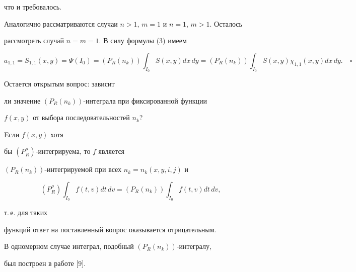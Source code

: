 что и требовалось.





Аналогично рассматриваются случаи $n>1$, $m=1$ и $n=1$, $m>1$. Осталось 


рассмотреть случай $n=m=1$. В силу формулы (3) имеем 


$$


a_{1,1}=S_{1,1}(x,y)=\Psi (I_{0})=


(P_{R}(n_k))\int_{I_0}S(x,y)dx\,dy=


(P_{R}(n_k))\int_{I_0}S(x,y)\chi _{1,1}(x,y)dx\,dy.\quad\square


$$








Остается открытым вопрос: зависит


ли значение $(P_{R}(n_{k}))$-интеграла при фиксированной функции


$f(x,y)$ от выбора последовательностей $n_{k}$?


Eсли $f(x,y)$ хотя


бы $(P^{\rho }_{R})$-интегрируема, то $f$ является 


$(P_{R}(n_{k}))$-интегрируемой при всех $n_k=n_k(x,y,i,j)$ и 


$$


(P^{\rho }_{R})\int_{I_{0}}f(t,v)dt\,dv=


(P_{R}(n_{k}))\int_{I_{0}}f(t,v)dt\,dv,


$$


т.\,е. для таких 


функций ответ на поставленный вопрос оказывается отрицательным.





В одномерном случае интеграл, подобный $(P_{R}(n_k))$-интегралу, 


был построен в работе [9].








